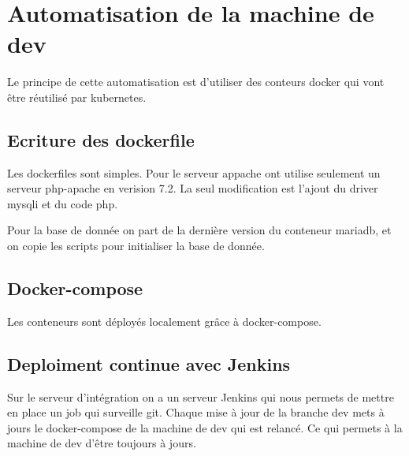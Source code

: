 ﻿\section{Automatisation de la machine de dev}
Le principe de cette automatisation est d'utiliser des conteurs docker qui vont être réutilisé par kubernetes.

\subsection{Ecriture des dockerfile}
Les dockerfiles sont simples.
Pour le serveur appache ont utilise seulement un serveur php-apache en verision 7.2. La seul modification est l'ajout du driver mysqli et du code php.



Pour la base de donnée on part de la dernière version du conteneur mariadb, et on copie les scripts pour initialiser la base de donnée.



\subsection{Docker-compose}
Les conteneurs sont déployés localement grâce à docker-compose.



\subsection{Deploiment continue avec Jenkins}
Sur le serveur d’intégration on a un serveur Jenkins qui nous permets de mettre en place un job qui surveille git.
Chaque mise à jour de la branche dev mets à jours le docker-compose de la machine de dev qui est relancé.
Ce qui permets à la machine de dev d'être toujours à jours.



